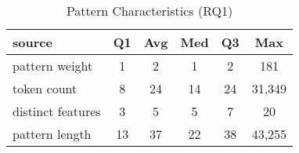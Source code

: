\begin{table}[tb]
\begin{center}
\caption{Pattern Characteristics (RQ1)}
\label{table:patternStats}

\begin{tabular}{l|ccccc}
\toprule
source & Q1 & Avg & Med & Q3 & Max \\ 
\midrule
pattern weight & 1 & 2 & 1 & 2 & 181 \\ 
\midrule
token count & 8 & 24 & 14 & 24 & 31,349 \\ 
\midrule
distinct features & 3 & 5 & 5 & 7 & 20 \\ 
\midrule
pattern length & 13 & 37 & 22 & 38 & 43,255 \\ 
\bottomrule
\end{tabular}
\end{center}
\end{table}
